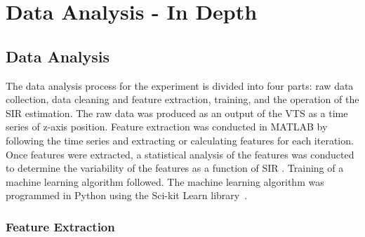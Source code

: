 \section{Data Analysis - In Depth}

\subsection{Data Analysis}\label{ftml-jrnl:sec:dataanalysis}


The data analysis process for the experiment
is divided into four parts: raw data collection, data cleaning and feature extraction, training, and the operation of the SIR estimation. The raw data was produced as an output of the VTS as a time series of z-axis position. Feature extraction was conducted in MATLAB by following the time series and extracting or calculating features for each iteration.  Once features were extracted, a statistical analysis of the features was conducted to determine the variability of the features as a function of SIR \cite{Candell_ISIT_2019}. Training of a machine learning algorithm followed. The machine learning algorithm was programmed in Python using the Sci-kit Learn library~\cite{SCIKITLEARN}.

\subsubsection{Feature Extraction}\label{ftml-jrnl:sec:data:feats}


